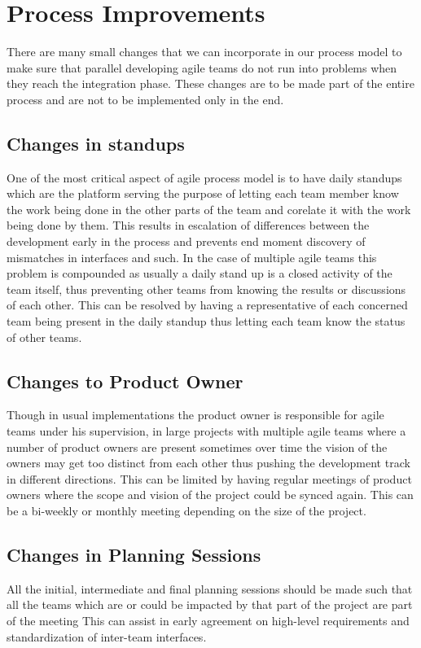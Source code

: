 \section{Process Improvements} 
\label{sec:proc_impv}
	There are many small changes that we can incorporate in our process model to make sure that parallel developing agile teams do not run into problems when they reach the integration phase. These changes are to be made part of the entire process and are not to be implemented only in the end.

\subsection{Changes in standups}
	One of the most critical aspect of agile process model is to have daily standups which are the platform serving the purpose of letting each team member know the work being done in the other parts of the team and corelate it with the work being done by them. This results in escalation of differences between the development early in the process and prevents end moment discovery of mismatches in interfaces and such. In the case of multiple agile teams this problem is compounded as usually a daily stand up is a closed activity of the team itself, thus preventing other teams from knowing the results or discussions of each other. This can be resolved by having a representative of each concerned team being present in the daily standup thus letting each team know the status of other teams.

\subsection{Changes to Product Owner}
	Though in usual implementations the product owner is responsible for agile teams under his supervision, in large projects with multiple agile teams where a number of product owners are present sometimes over time the vision of the owners may get too distinct from each other thus pushing the development track in different directions. This can be limited by having regular meetings of product owners where the scope and vision of the project could be synced again. This can be a bi-weekly or monthly meeting depending on the size of the project.

\subsection{Changes in Planning Sessions}
	All the initial, intermediate and final planning sessions should be made such that all the teams which are or could be impacted by that part of the project are part of the meeting This can assist in early agreement on high-level requirements and standardization of inter-team interfaces.
